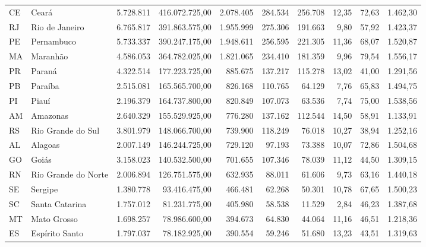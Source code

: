 \begin{apendicesenv}
\begin{landscape}
{\begin{longtable}{llrrrrrrrr}
        CE & Ceará               &  5.728.811 & 416.072.725,00 & 2.078.405 & 284.534 & 256.708 & 12,35 & 72,63 & 1.462,30 \\
        RJ & Rio de Janeiro      &  6.765.817 & 391.863.575,00 & 1.955.999 & 275.306 & 191.663 &  9,80 & 57,92 & 1.423,37 \\
        PE & Pernambuco          &  5.733.337 & 390.247.175,00 & 1.948.611 & 256.595 & 221.305 & 11,36 & 68,07 & 1.520,87 \\
        MA & Maranhão            &  4.586.053 & 364.782.025,00 & 1.821.065 & 234.410 & 181.359 &  9,96 & 79,54 & 1.556,17 \\
        PR & Paraná              &  4.322.514 & 177.223.725,00 &   885.675 & 137.217 & 115.278 & 13,02 & 41,00 & 1.291,56 \\
        PB & Paraíba             &  2.515.081 & 165.565.700,00 &   826.168 & 110.765 &  64.129 &  7,76 & 65,83 & 1.494,75 \\
        PI & Piauí               &  2.196.379 & 164.737.800,00 &   820.849 & 107.073 &  63.536 &  7,74 & 75,00 & 1.538,56 \\
        AM & Amazonas            &  2.640.329 & 155.529.925,00 &   776.280 & 137.162 & 112.544 & 14,50 & 58,91 & 1.133,91 \\
        RS & Rio Grande do Sul   &  3.801.979 & 148.066.700,00 &   739.900 & 118.249 &  76.018 & 10,27 & 38,94 & 1.252,16 \\
        AL & Alagoas             &  2.007.149 & 146.244.725,00 &   729.120 &  97.193 &  73.388 & 10,07 & 72,86 & 1.504,68 \\
        GO & Goiás               &  3.158.023 & 140.532.500,00 &   701.655 & 107.346 &  78.039 & 11,12 & 44,50 & 1.309,15 \\
        RN & Rio Grande do Norte &  2.006.894 & 126.751.575,00 &   632.935 &  88.011 &  61.606 &  9,73 & 63,16 & 1.440,18 \\
        SE & Sergipe             &  1.380.778 &  93.416.475,00 &   466.481 &  62.268 &  50.301 & 10,78 & 67,65 & 1.500,23 \\
        SC & Santa Catarina      &  1.757.012 &  81.231.775,00 &   405.980 &  58.538 &  11.529 &  2,84 & 46,23 & 1.387,68 \\
        MT & Mato Grosso         &  1.698.257 &  78.986.600,00 &   394.673 &  64.830 &  44.064 & 11,16 & 46,51 & 1.218,36 \\
        ES & Espírito Santo      &  1.797.037 &  78.182.925,00 &   390.554 &  59.246 &  51.680 & 13,23 & 43,51 & 1.319,63 \\

\end{longtable}}
\end{landscape}
\end{apendicesenv}
